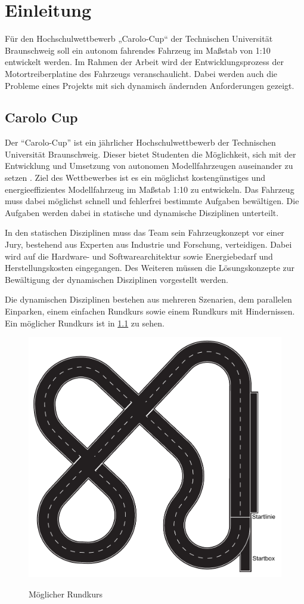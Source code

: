 \chapter{Einleitung}

Für den Hochschulwettbewerb „Carolo-Cup“ der Technischen Universität Braunschweig soll ein autonom fahrendes Fahrzeug im Maßstab von 1:10
entwickelt werden. Im Rahmen der Arbeit wird der Entwicklungsprozess der Motortreiberplatine des Fahrzeugs veranschaulicht.
Dabei werden auch die Probleme eines Projekts mit sich dynamisch ändernden Anforderungen gezeigt. 


\section{Carolo Cup}
Der ``Carolo-Cup'' ist ein jährlicher Hochschulwettbewerb der Technischen Universität Braunschweig. Dieser bietet Studenten die Möglichkeit, sich mit der Entwicklung 
und Umsetzung von autonomen Modellfahrzeugen auseinander zu setzen \cite{website-carolo-cup}. Ziel des Wettbewerbes ist es ein möglichst kostengünstiges
und energieeffizientes Modellfahrzeug im Maßstab 1:10 zu entwickeln. Das Fahrzeug muss dabei möglichst schnell und fehlerfrei bestimmte Aufgaben
bewältigen. Die Aufgaben werden dabei in statische und dynamische Disziplinen unterteilt. 

In den statischen Disziplinen muss das Team sein Fahrzeugkonzept vor einer Jury, bestehend aus Experten aus Industrie und Forschung, verteidigen.
Dabei wird auf die Hardware- und Softwarearchitektur sowie Energiebedarf und Herstellungskosten eingegangen. Des Weiteren müssen die Lösungskonzepte
zur Bewältigung der dynamischen Disziplinen vorgestellt werden.

Die dynamischen Disziplinen bestehen aus mehreren Szenarien, dem parallelen Einparken, einem einfachen Rundkurs sowie einem Rundkurs mit Hindernissen.
Ein möglicher Rundkurs ist in \cref{fig:Rundkurs} zu sehen.

\begin{figure}[H]
\centering
\includegraphics[width=.8\textwidth]{Strecke.png}\\
\caption{Möglicher Rundkurs \cite{website-carolo-cup-regelwerk}}
\label{fig:Rundkurs}
\end{figure}

